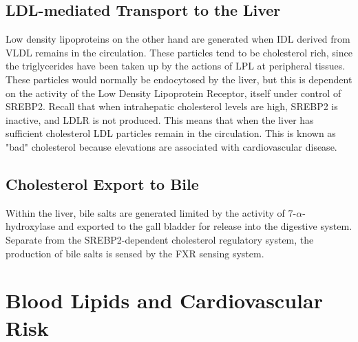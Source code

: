 \documentclass{tufte-handout}
\begin{document}
\subsection{LDL-mediated Transport to the Liver}

Low density lipoproteins on the other hand are generated when IDL derived from VLDL remains in the circulation.  These particles tend to be cholesterol rich, since the triglycerides have been taken up by the actions of LPL at peripheral tissues.  These particles would normally be endocytosed by the liver, but this is dependent on the activity of the Low Density Lipoprotein Receptor, itself under control of SREBP2.  Recall that when intrahepatic cholesterol levels are high, SREBP2 is inactive, and LDLR is not produced.  This means that when the liver has sufficient cholesterol LDL particles remain in the circulation.  This is known as "bad" cholesterol because elevations are associated with cardiovascular disease.  

\subsection{Cholesterol Export to Bile}

Within the liver, bile salts are generated limited by the activity of 7-$\alpha$-hydroxylase and exported to the gall bladder for release into the digestive system.  Separate from the SREBP2-dependent cholesterol regulatory system, the production of bile salts is sensed by the FXR sensing system.

\section{Blood Lipids and Cardiovascular Risk}


\end{document}
